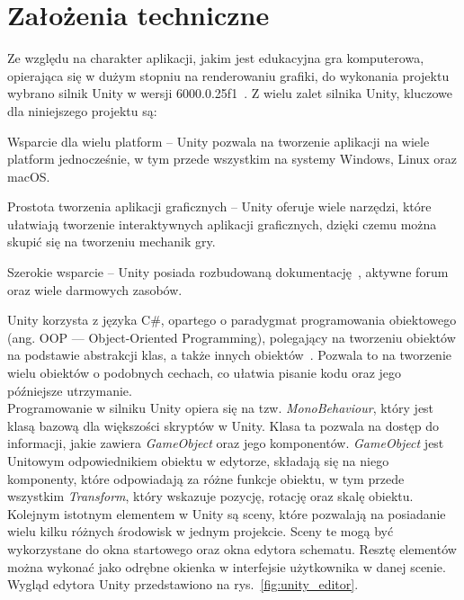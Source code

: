 \section{Założenia techniczne}
\label{sec:zalozenia_techniczne}

Ze względu na charakter aplikacji, jakim jest edukacyjna gra komputerowa,
opierająca się w dużym stopniu na renderowaniu grafiki,
do wykonania projektu wybrano silnik Unity w wersji 6000.0.25f1~\cite{unity_site}.
Z wielu zalet silnika Unity, kluczowe dla niniejszego projektu są:

\begin{citemize}
    \item Wsparcie dla wielu platform --
    Unity pozwala na tworzenie aplikacji na wiele platform jednocześnie, w tym przede wszystkim na systemy Windows, Linux oraz macOS.
    \item Prostota tworzenia aplikacji graficznych --
    Unity oferuje wiele narzędzi, które ułatwiają tworzenie interaktywnych aplikacji graficznych,
    dzięki czemu można skupić się na tworzeniu mechanik gry.
    \item Szerokie wsparcie --
    Unity posiada rozbudowaną dokumentację~\cite{unity_docs},
    aktywne forum~\cite{unity_forum} oraz wiele darmowych zasobów.
\end{citemize}

Unity korzysta z języka C\#, opartego o paradygmat programowania obiektowego (ang. OOP — Object-Oriented Programming),
polegający na tworzeniu obiektów na podstawie abstrakcji klas, a także innych obiektów~\cite{nygaard1986basic}.
Pozwala to na tworzenie wielu obiektów o podobnych cechach, co ułatwia pisanie kodu oraz jego późniejsze utrzymanie.\\
\indent Programowanie w silniku Unity opiera się na tzw. \textit{MonoBehaviour},
który jest klasą bazową dla większości skryptów w Unity.
Klasa ta pozwala na dostęp do informacji, jakie zawiera \textit{GameObject} oraz jego komponentów.
\textit{GameObject} jest Unitowym odpowiednikiem obiektu w edytorze,
składają się na niego komponenty, które odpowiadają za różne funkcje obiektu,
w tym przede wszystkim \textit{Transform}, który wskazuje pozycję, rotację oraz skalę obiektu.\\
\indent Kolejnym istotnym elementem w Unity są sceny,
które pozwalają na posiadanie wielu kilku różnych środowisk w jednym projekcie.
Sceny te mogą być wykorzystane do okna startowego oraz okna edytora schematu.
Resztę elementów można wykonać jako odrębne okienka w interfejsie użytkownika w danej scenie.
Wygląd edytora Unity przedstawiono na rys.~\ref{fig:unity_editor}.

